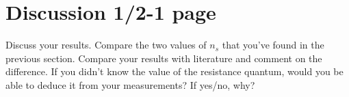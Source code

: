 \documentclass[a4paper]{article}
\begin{document}
\section{Discussion 1/2-1 page}
Discuss your results. Compare the two values of $n_{s}$ that you've found in the previous section. Compare your results with literature and comment on the difference. If you didn't know the value of the resistance quantum, would you be able to deduce it from your measurements? If yes/no, why?

\begin{comment} %

\newpage
\section{Some LaTeX tips}
\label{sec:latex}
\subsection{How to Include Figures}

First you have to upload the image file (JPEG, PNG or PDF) from your computer to writeLaTeX using the upload link the project menu. Then use the includegraphics command to include it in your document. Use the figure environment and the caption command to add a number and a caption to your figure. See the code for Figure \ref{fig:frog} in this section for an example.




\subsection{How to Write Mathematics}

\LaTeX{} is great at typesetting mathematics. Let $X_1, X_2, \ldots, X_n$ be a sequence of independent and identically distributed random variables with $\text{E}[X_i] = \mu$ and $\text{Var}[X_i] = \sigma^2 < \infty$, and let

\begin{equation}
S_n = \frac{X_1 + X_2 + \cdots + X_n}{n}
      = \frac{1}{n}\sum_{i}^{n} X_i
\label{eq:sn}
\end{equation}

denote their mean. Then as $n$ approaches infinity, the random variables $\sqrt{n}(S_n - \mu)$ converge in distribution to a normal $\mathcal{N}(0, \sigma^2)$.


\end{comment}
\end{document}
